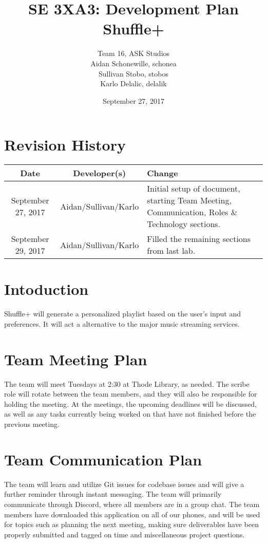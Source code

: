 \documentclass{article}
\title{SE 3XA3: Development Plan\\Shuffle+}
\author{Team 16, ASK Studios
        \\ Aidan Schonewille, schonea
        \\ Sullivan Stobo, stobos
        \\ Karlo Delalic, delalik
}
\date{September 27, 2017}
\begin{document}
\section*{Revision History}
\begin{center}
\begin{tabular}{| c | c | p{6cm} |}
\hline
\textbf{Date} & \textbf{Developer(s)} & \textbf{Change}\\
\hline
September 27, 2017 & Aidan/Sullivan/Karlo & Initial setup of document, starting Team Meeting, Communication, Roles \& Technology sections.\\
\hline
September 29, 2017 & Aidan/Sullivan/Karlo & Filled the remaining sections from last lab.\\
\hline
\end{tabular}
\end{center}

\newpage

\maketitle

\newpage

\section*{Intoduction}
Shuffle+ will generate a personalized playlist based on the user's input and preferences. It will act a alternative to the major music streaming services.

\section{Team Meeting Plan}
The team will meet Tuesdays at 2:30 at Thode Library, as needed. The scribe role will rotate between the team members, and they will also be responsible for holding the meeting. At the meetings, the upcoming deadlines will be discussed, as well as any tasks currently being worked on that have not finished before the previous meeting.

\section{Team Communication Plan}
The team will learn and utilize Git issues for codebase issues and will give a further reminder through instant messaging. The team will primarily communicate through Discord, where all members are in a group chat. The team members have downloaded this application on all of our phones, and will be used for topics such as planning the next meeting, making sure deliverables have been properly submitted and tagged on time and miscellaneous project questions.
\end{document}
